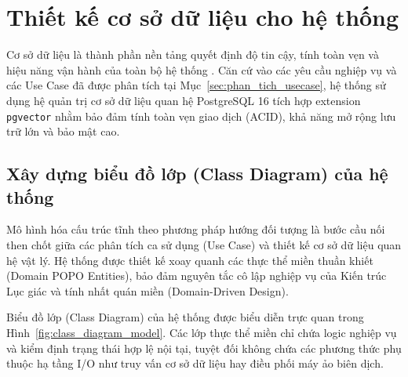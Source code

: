 \FloatBarrier
\section{Thiết kế cơ sở dữ liệu cho hệ thống}
\label{sec:thiet_ke_csdl}

Cơ sở dữ liệu là thành phần nền tảng quyết định độ tin cậy, tính toàn vẹn và hiệu năng vận hành của toàn bộ hệ thống \VS. Căn cứ vào các yêu cầu nghiệp vụ và các Use Case đã được phân tích tại Mục~\ref{sec:phan_tich_usecase}, hệ thống sử dụng hệ quản trị cơ sở dữ liệu quan hệ PostgreSQL 16 tích hợp extension \texttt{pgvector} nhằm bảo đảm tính toàn vẹn giao dịch (ACID), khả năng mở rộng lưu trữ lớn và bảo mật cao.

\subsection{Xây dựng biểu đồ lớp (Class Diagram) của hệ thống}
\label{subsec:csdl_class_diagram}

Mô hình hóa cấu trúc tĩnh theo phương pháp hướng đối tượng là bước cầu nối then chốt giữa các phân tích ca sử dụng (Use Case) và thiết kế cơ sở dữ liệu quan hệ vật lý. Hệ thống \VS được thiết kế xoay quanh các thực thể miền thuần khiết (Domain POPO Entities), bảo đảm nguyên tắc cô lập nghiệp vụ của Kiến trúc Lục giác và tính nhất quán miền (Domain-Driven Design).

Biểu đồ lớp (Class Diagram) của hệ thống được biểu diễn trực quan trong Hình~\ref{fig:class_diagram_model}. Các lớp thực thể miền chỉ chứa logic nghiệp vụ và kiểm định trạng thái hợp lệ nội tại, tuyệt đối không chứa các phương thức phụ thuộc hạ tầng I/O như truy vấn cơ sở dữ liệu hay điều phối máy ảo biên dịch.

